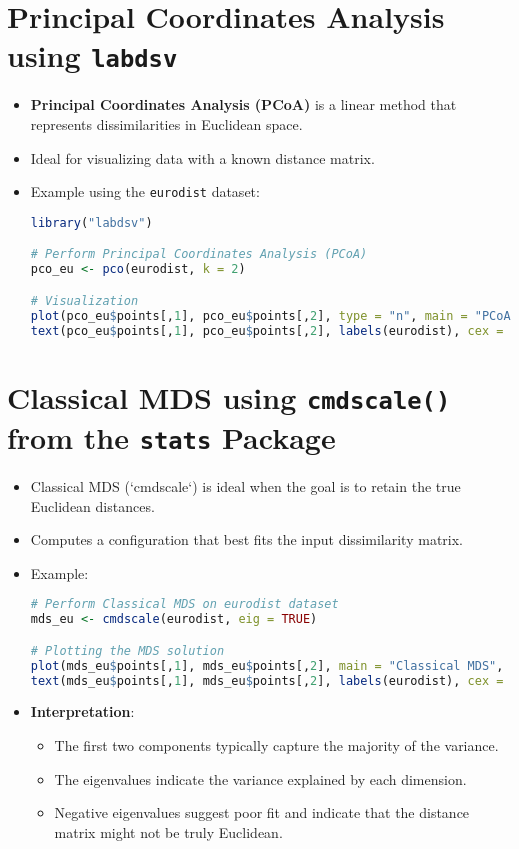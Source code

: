 \documentclass{article}
\begin{document}
\section{Principal Coordinates Analysis using \texttt{labdsv}}
\begin{itemize}
    \item \textbf{Principal Coordinates Analysis (PCoA)} is a linear method that represents dissimilarities in Euclidean space.
    \item Ideal for visualizing data with a known distance matrix.
    \item Example using the \texttt{eurodist} dataset:
\begin{lstlisting}[language=R, breaklines=true]
library("labdsv")

# Perform Principal Coordinates Analysis (PCoA)
pco_eu <- pco(eurodist, k = 2)

# Visualization
plot(pco_eu$points[,1], pco_eu$points[,2], type = "n", main = "PCoA of European Cities")
text(pco_eu$points[,1], pco_eu$points[,2], labels(eurodist), cex = 0.8)
\end{lstlisting}
\end{itemize}

\section{Classical MDS using \texttt{cmdscale()} from the \texttt{stats} Package}
\begin{itemize}
    \item Classical MDS (`cmdscale`) is ideal when the goal is to retain the true Euclidean distances.
    \item Computes a configuration that best fits the input dissimilarity matrix.
    \item Example:
\begin{lstlisting}[language=R, breaklines=true]
# Perform Classical MDS on eurodist dataset
mds_eu <- cmdscale(eurodist, eig = TRUE)

# Plotting the MDS solution
plot(mds_eu$points[,1], mds_eu$points[,2], main = "Classical MDS", type = "n")
text(mds_eu$points[,1], mds_eu$points[,2], labels(eurodist), cex = 0.8)
\end{lstlisting}

\item \textbf{Interpretation}:
    \begin{itemize}
        \item The first two components typically capture the majority of the variance.
        \item The eigenvalues indicate the variance explained by each dimension.
        \item Negative eigenvalues suggest poor fit and indicate that the distance matrix might not be truly Euclidean.
    \end{itemize}
\end{itemize}
\end{document}

